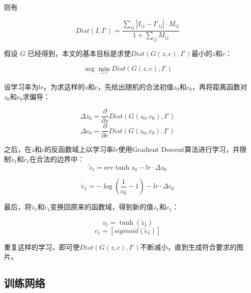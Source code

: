 \documentclass[a4paper,12pt,UTF8]{ctexart}
\begin{document}
则有

\begin{equation}
  Dist(I, I') = \frac{\sum_{ij} |I_{ij} - I'_{ij}| \cdot M_{ij}}{1 + \sum_{ij} M_{ij}}
\end{equation}

假设 $G$ 已经得到，本文的基本目标是求使$Dist(G(z, c), I')$最小的$z$和$c$：

\begin{equation}
  \arg\min_{z, c} Dist(G(z, c), I')
\end{equation}

设学习率为$lr$。为求这样的$z$和$c$，先给出随机的合法初值$z_{0}$和$c_{0}$，再将距离函数对$z_{0}$和$c_{0}$求偏导：

\begin{equation}
  \Delta z_{0} = \frac{\partial}{\partial z} Dist(G(z_{0}, c_{0}), I')
\end{equation}
\begin{equation}
  \Delta c_{0} = \frac{\partial}{\partial c} Dist(G(z_{0}, c_{0}), I')
\end{equation}

之后，在$z$和$c$的反函数域上以学习率$lr$使用Gradient Descent算法进行学习，并限制$\tilde z_{1}$和$\tilde c_{1}$在合法的边界中：
\begin{equation}
  \tilde z_{1} = arc \tanh z_{0} - lr \cdot \Delta z_{0}
\end{equation}

\begin{equation}
  \tilde c_{1} = - \log (\frac{1}{c_{0}} - 1) - lr \cdot \Delta c_{0}
\end{equation}

最后，将$\tilde z_{1}$和$\tilde c_{1}$变换回原来的函数域，得到新的值$z_{1}$和$c_{1}$：

\begin{equation}
  z_{1} = \tanh (\tilde z_{1})
\end{equation}
\begin{equation}
  c_{1} = [ sigmoid(\tilde c_{1}) ]
\end{equation}

重复这样的学习，即可使$Dist(G(z, c), I')$不断减小，直到生成符合要求的图片。

\subsection{训练网络}

\end{document}
